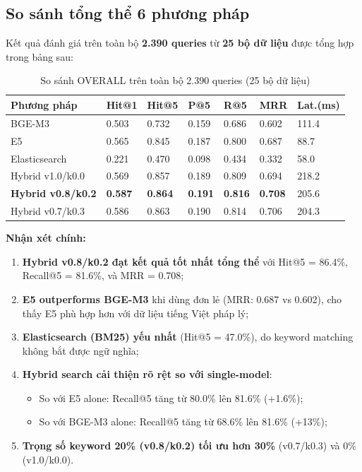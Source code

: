 \documentclass[../DoAn.tex]{subfiles}
\begin{document}
\subsection{So sánh tổng thể 6 phương pháp}

Kết quả đánh giá trên toàn bộ \textbf{2.390 queries} từ \textbf{25 bộ dữ liệu} được tổng hợp trong bảng sau:

\begin{table}[H]
\centering
\begin{tabular}{|l|l|l|l|l|l|l|}
\hline
\textbf{Phương pháp} & \textbf{Hit@1} & \textbf{Hit@5} & \textbf{P@5} & \textbf{R@5} & \textbf{MRR} & \textbf{Lat.(ms)} \\
\hline
BGE-M3 & 0.503 & 0.732 & 0.159 & 0.686 & 0.602 & 111.4 \\
\hline
E5 & 0.565 & 0.845 & 0.187 & 0.800 & 0.687 & 88.7 \\
\hline
Elasticsearch & 0.221 & 0.470 & 0.098 & 0.434 & 0.332 & 58.0 \\
\hline
Hybrid v1.0/k0.0 & 0.569 & 0.857 & 0.189 & 0.809 & 0.694 & 218.2 \\
\hline
\textbf{Hybrid v0.8/k0.2} & \textbf{0.587} & \textbf{0.864} & \textbf{0.191} & \textbf{0.816} & \textbf{0.708} & 205.6 \\
\hline
Hybrid v0.7/k0.3 & 0.586 & 0.863 & 0.190 & 0.814 & 0.706 & 204.3 \\
\hline
\end{tabular}
\caption{So sánh OVERALL trên toàn bộ 2.390 queries (25 bộ dữ liệu)}
\end{table}

\textbf{Nhận xét chính:}
\begin{enumerate}
    \item \textbf{Hybrid v0.8/k0.2 đạt kết quả tốt nhất tổng thể} với Hit@5 = 86.4\%, Recall@5 = 81.6\%, và MRR = 0.708;
    \item \textbf{E5 outperforms BGE-M3} khi dùng đơn lẻ (MRR: 0.687 vs 0.602), cho thấy E5 phù hợp hơn với dữ liệu tiếng Việt pháp lý;
    \item \textbf{Elasticsearch (BM25) yếu nhất} (Hit@5 = 47.0\%), do keyword matching không bắt được ngữ nghĩa;
    \item \textbf{Hybrid search cải thiện rõ rệt so với single-model}:
    \begin{itemize}
        \item So với E5 alone: Recall@5 tăng từ 80.0\% lên 81.6\% (+1.6\%);
        \item So với BGE-M3 alone: Recall@5 tăng từ 68.6\% lên 81.6\% (+13\%);
    \end{itemize}
    \item \textbf{Trọng số keyword 20\% (v0.8/k0.2) tối ưu hơn 30\%} (v0.7/k0.3) và 0\% (v1.0/k0.0).
\end{enumerate}
\end{document}
